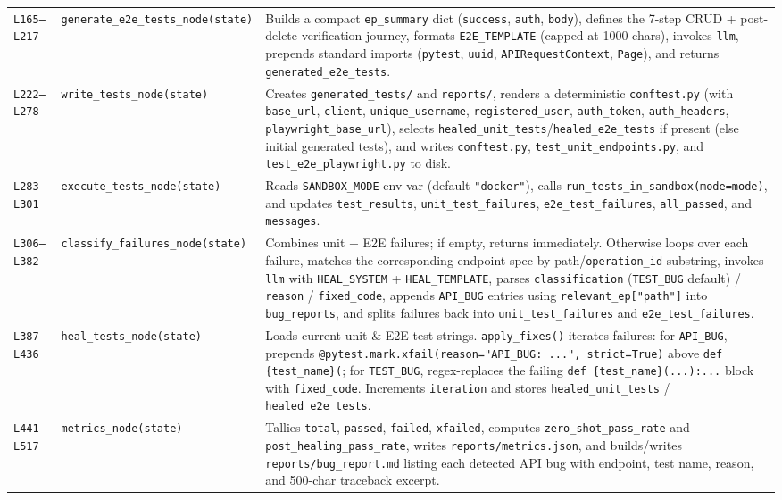 \documentclass[11pt,a4paper]{article}
\begin{document}
\begin{longtable}{L{1.4cm} L{5.2cm} L{9.0cm}}
\texttt{L165--L217} & \texttt{generate\_e2e\_tests\_node(state)} & Builds a compact \texttt{ep\_summary} dict (\texttt{success}, \texttt{auth}, \texttt{body}), defines the 7-step CRUD + post-delete verification journey, formats \texttt{E2E\_TEMPLATE} (capped at 1000 chars), invokes \texttt{llm}, prepends standard imports (\texttt{pytest}, \texttt{uuid}, \texttt{APIRequestContext}, \texttt{Page}), and returns \texttt{generated\_e2e\_tests}. \\
\texttt{L222--L278} & \texttt{write\_tests\_node(state)} & Creates \texttt{generated\_tests/} and \texttt{reports/}, renders a deterministic \texttt{conftest.py} (with \texttt{base\_url}, \texttt{client}, \texttt{unique\_username}, \texttt{registered\_user}, \texttt{auth\_token}, \texttt{auth\_headers}, \texttt{playwright\_base\_url}), selects \texttt{healed\_unit\_tests}/\texttt{healed\_e2e\_tests} if present (else initial generated tests), and writes \texttt{conftest.py}, \texttt{test\_unit\_endpoints.py}, and \texttt{test\_e2e\_playwright.py} to disk. \\
\texttt{L283--L301} & \texttt{execute\_tests\_node(state)} & Reads \texttt{SANDBOX\_MODE} env var (default \texttt{"docker"}), calls \texttt{run\_tests\_in\_sandbox(mode=mode)}, and updates \texttt{test\_results}, \texttt{unit\_test\_failures}, \texttt{e2e\_test\_failures}, \texttt{all\_passed}, and \texttt{messages}. \\
\texttt{L306--L382} & \texttt{classify\_failures\_node(state)} & Combines unit + E2E failures; if empty, returns immediately. Otherwise loops over each failure, matches the corresponding endpoint spec by path/\texttt{operation\_id} substring, invokes \texttt{llm} with \texttt{HEAL\_SYSTEM} + \texttt{HEAL\_TEMPLATE}, parses \texttt{classification} (\texttt{TEST\_BUG} default) / \texttt{reason} / \texttt{fixed\_code}, appends \texttt{API\_BUG} entries using \texttt{relevant\_ep["path"]} into \texttt{bug\_reports}, and splits failures back into \texttt{unit\_test\_failures} and \texttt{e2e\_test\_failures}. \\
\texttt{L387--L436} & \texttt{heal\_tests\_node(state)} & Loads current unit \& E2E test strings. \texttt{apply\_fixes()} iterates failures: for \texttt{API\_BUG}, prepends \texttt{@pytest.mark.xfail(reason="API\_BUG: ...", strict=True)} above \texttt{def \{test\_name\}(}; for \texttt{TEST\_BUG}, regex-replaces the failing \texttt{def \{test\_name\}(...):...} block with \texttt{fixed\_code}. Increments \texttt{iteration} and stores \texttt{healed\_unit\_tests} / \texttt{healed\_e2e\_tests}. \\
\texttt{L441--L517} & \texttt{metrics\_node(state)} & Tallies \texttt{total}, \texttt{passed}, \texttt{failed}, \texttt{xfailed}, computes \texttt{zero\_shot\_pass\_rate} and \texttt{post\_healing\_pass\_rate}, writes \texttt{reports/metrics.json}, and builds/writes \texttt{reports/bug\_report.md} listing each detected API bug with endpoint, test name, reason, and 500-char traceback excerpt. \\
\bottomrule
\end{longtable}
\end{document}
